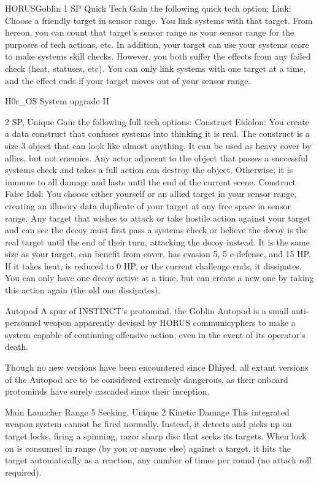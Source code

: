 \begin{mech}{HORUS}{Goblin}
1 SP
Quick Tech
Gain the following quick tech option:
Link: Choose a friendly target in sensor range. You link systems with that target. From hereon, you can count that target's sensor range as your sensor range for the purposes of tech actions, etc. In addition, your target can use your systems score to make systems skill checks. However, you both suffer the effects from any failed check (heat, statuses, etc). You can only link systems with one target at a time, and the effect ends if your target moves out of your sensor range.

H0r\_OS System upgrade II

2 SP, Unique
Gain the following full tech options:
Construct Eidolon: You create a data construct that confuses systems into thinking it is real. The construct is a size 3 object that can look like almost anything. It can be used as heavy cover by allies, but not enemies. Any actor adjacent to the object that passes a successful systems check and takes a full action can destroy the object. Otherwise, it is immune to all damage and lasts until the end of the current scene.
Construct False Idol: You choose either yourself or an allied target in your sensor range, creating an illusory data duplicate of your target at any free space in sensor range. Any target that wishes to attack or take hostile action against your target and can see the decoy must first pass a systems check or believe the decoy is the real target until the end of their turn, attacking the decoy instead. It is the same size as your target, can benefit from cover, has evasion 5, 5 e-defense, and 15 HP. If it takes heat, is reduced to 0 HP, or the current challenge ends, it dissipates. You can only have one decoy active at a time, but can create a new one by taking this action again (the old one dissipates).

Autopod
A spur of INSTINCT's protomind, the Goblin Autopod is a small anti-personnel weapon apparently devised by HORUS communicyphers to make a system capable of continuing offensive action, even in the event of its operator's death.

Though no new versions have been encountered since Dhiyed, all extant versions of the Autopod are to be considered extremely dangerous, as their onboard protominds have surely cascaded since their inception.

Main Launcher
Range 5
Seeking, Unique
2 Kinetic Damage
This integrated weapon system cannot be fired normally. Instead, it detects and picks up on target locks, firing a spinning, razor sharp disc that seeks its targets. When lock on is consumed in range (by you or anyone else) against a target, it hits the target automatically as a reaction, any number of times per round (no attack roll required).


\end{mech}
